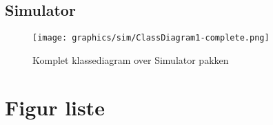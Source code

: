 \documentclass[a4paper]{article}
\newenvironment{changemargin}[2]{%
\begin{list}{}{%
\setlength{\topsep}{0pt}%
\setlength{\leftmargin}{#1}%
\setlength{\rightmargin}{#2}%
\setlength{\listparindent}{\parindent}%
\setlength{\itemindent}{\parindent}%
\setlength{\parsep}{\parskip}%
}%
\item[]}{\end{list}}
\begin{document}
\subsection{Simulator} %

\begin{figure}[H]
\begin{changemargin}{-2.5cm}{-2.5cm}
  \centering
  \texttt{[image: graphics/sim/ClassDiagram1-complete.png]}
  \caption{Komplet klassediagram over Simulator pakken}
\end{changemargin}
\end{figure}



\clearpage

\section{Figur liste} %
\listoffigures
\end{document}
